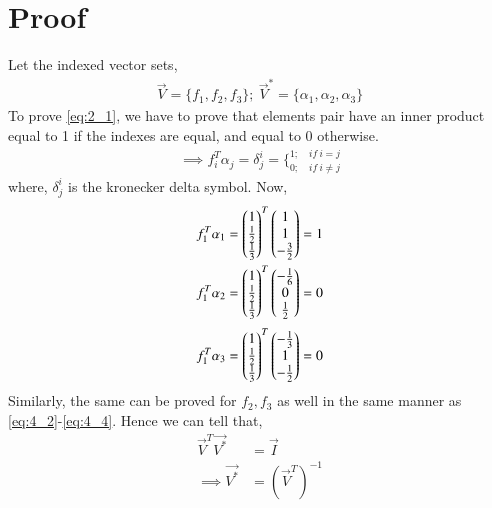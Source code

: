 \documentclass[journal,12pt,twocolumn]{IEEEtran}
\begin{document}
\section{Proof}
Let the indexed vector sets,
\begin{align}
    \vec{V} = \{f_1, f_2, f_3\}; \: \vec{V}^* = \{\alpha_1, \alpha_2, \alpha_3\} \nonumber 
\end{align}
To prove \eqref{eq:2_1}, we have to prove that elements pair have an inner product equal to 1 if the indexes are equal, and equal to 0 otherwise. 
\begin{align} \label{eq:4_1}
    \implies f_i^T\alpha_j = \delta_j^{i} = 
    \bigg\{_{0; \quad if \: i \neq j}^{1; \quad if \: i = j} 
\end{align}
where, $\delta_j^{i}$ is the kronecker delta symbol.
Now,
\begin{align}
    f_1^T\alpha_1 = \begin{pmatrix}1 \\ \frac{1}{2} \\ \frac{1}{3}\end{pmatrix}^T 
    \begin{pmatrix}1 \\ 1 \\ -\frac{3}{2}\end{pmatrix} = 1 \label{eq:4_2} \\
    f_1^T\alpha_2 = \begin{pmatrix}1 \\ \frac{1}{2} \\ \frac{1}{3}\end{pmatrix}^T 
    \begin{pmatrix}-\frac{1}{6} \\ 0 \\ \frac{1}{2}\end{pmatrix} = 0 \label{eq:4_3}
\end{align}
\begin{align}
    f_1^T\alpha_3 = \begin{pmatrix}1 \\ \frac{1}{2} \\ \frac{1}{3}\end{pmatrix}^T 
    \begin{pmatrix}-\frac{1}{3} \\ 1 \\ -\frac{1}{2}\end{pmatrix} = 0 \label{eq:4_4}
\end{align}
Similarly, the same can be proved for $f_2, f_3$ as well in the same manner as \eqref{eq:4_2}-\eqref{eq:4_4}. Hence we can tell that,
\begin{align}
    \vec{V}^T\vec{V^*} &= \vec{I} \nonumber \\
    \implies \vec{V^*} &= (\vec{V}^T)^{-1}
\end{align}
\end{document}
